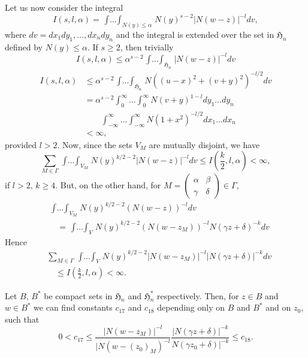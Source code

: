 Let us now consider the integral
$$
I(s,l,\alpha)=\mathop{\int\ldots\int}_{N(y)\leq\alpha}N(y)^{s-2}|N(w-z)|^{-l}dv,
$$
where $dv=dx_{1}dy_{1},\ldots,dx_{n}dy_{n}$ and the integral is
extended over the set in $\mathfrak{H}_{n}$ defined by $N(y)\leq
\alpha$. If $s\geq 2$, then trivially
$$
I(s,l,\alpha)\leq
\alpha^{s-2}\mathop{\int\ldots\int}_{\mathfrak{H}_{n}}|N(w-z)|^{-l}dv
$$
\ie
\begin{align*}
I(s,l,\alpha) &\leq
\alpha^{s-2}\mathop{\int\ldots\int}_{\mathfrak{H}_{n}}N((u-x)^{2}+(v+y)^{2})^{-l/2}dv\\
&=
\alpha^{s-2}\int^{\infty}_{0}\ldots\int^{\infty}_{0}N(v+y)^{1-l}dy_{1}\ldots
dy_{n}\\
&\qquad
\int^{\infty}_{-\infty}\ldots\int^{\infty}_{-\infty}N(1+x^{2})^{-l/2}dx_{1}\ldots
dx_{n}\\
&<\infty,
\end{align*}\pageoriginale
provided $l>2$. Now, since the sets $V_{M}$ are mutually disjoint, we
have
$$
\sum_{M\in\Gamma}\mathop{\int\ldots\int}_{V_{M}}N(y)^{k/2-2}|N(w-z)|^{-l}dv\leq
I\left(\frac{k}{2},l,\alpha\right)<\infty, 
$$
if $l>2$, $k\geq 4$. But, on the other hand, for
$M=\left(\begin{smallmatrix} \alpha & \beta\\ \gamma & \delta
\end{smallmatrix}\right)\in\Gamma$,
\begin{align*}
& \mathop{\int\ldots\int}_{V_{M}}N(y)^{k/2-2}(N(w-z))^{-l}dv\\
& \quad
  =\mathop{\int\ldots\int}_{V}N(y)^{k/2-2}(N(w-z_{M}))^{-l}N(\gamma
  z+\delta)^{-k}dv 
\end{align*}
Hence
\begin{equation*}
\begin{split}
& \sum_{M\in\Gamma}\mathop{\int\ldots\int}_{V}N(y)^{k/2-2}|N(w-z_{M})|^{-l}|N(\gamma
z+\delta)|^{-k}dv\\
&\quad \leq I\left(\frac{k}{2},l,\alpha\right)<\infty.
\end{split}\tag{174}\label{174}
\end{equation*}

Let $B$, $B^{\ast}$ be compact sets in $\mathfrak{H}_{n}$ and
$\mathfrak{H}^{\ast}_{n}$ respectively. Then, for $z\in B$ and $w\in
B^{\ast}$ we can find constants $c_{17}$ and $c_{18}$ depending only
on $B$ and $B^{\ast}$ and on $z_{0}$, such that
\begin{equation*}
0<c_{17}\leq
\frac{|N(w-z_{M})|^{-l}}{|N(w-(z_{0})_{M})^{-l}}\frac{|N(\gamma
  z+\delta)|^{-k}}{N(\gamma z_{0}+\delta)|^{-k}}\leq
c_{18}.
\tag{175}\label{175} 
\end{equation*}

